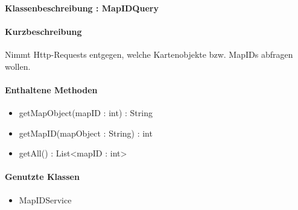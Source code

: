 \paragraph{Klassenbeschreibung : MapIDQuery}%
\paragraph*{Kurzbeschreibung}
Nimmt Http-Requests entgegen, welche Kartenobjekte bzw. MapIDs abfragen wollen.
\paragraph*{Enthaltene Methoden}
\begin{itemize}
    \item getMapObject(mapID : int) : String
    \item getMapID(mapObject : String) : int
    \item getAll() : List<mapID : int>
\end{itemize}
\paragraph*{Genutzte Klassen}
\begin{itemize}
    \item MapIDService
\end{itemize}
